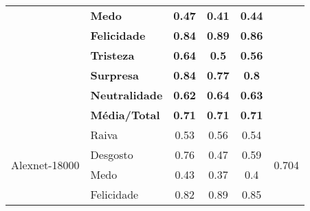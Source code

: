 \begin{table}[]
\begin{tabular}{llcccc}
                                        & \textbf{Medo}         & \textbf{0.47}                         & \textbf{0.41}                          & \textbf{0.44}                         &                                       \\
                                        & \textbf{Felicidade}   & \textbf{0.84}                         & \textbf{0.89}                          & \textbf{0.86}                         &                                       \\
                                        & \textbf{Tristeza}     & \textbf{0.64}                         & \textbf{0.5}                           & \textbf{0.56}                         &                                       \\
                                        & \textbf{Surpresa}     & \textbf{0.84}                         & \textbf{0.77}                          & \textbf{0.8}                          &                                       \\
                                        & \textbf{Neutralidade} & \textbf{0.62}                         & \textbf{0.64}                          & \textbf{0.63}                         &                                       \\
                                        & \textbf{Média/Total}  & \textbf{0.71}                         & \textbf{0.71}                          & \textbf{0.71}                         &                                       \\ \hline
\multirow{8}{*}{Alexnet-18000}          & Raiva                 & 0.53                                  & 0.56                                   & 0.54                                  & \multirow{8}{*}{0.704}                \\
                                        & Desgosto              & 0.76                                  & 0.47                                   & 0.59                                  &                                       \\
                                        & Medo                  & 0.43                                  & 0.37                                   & 0.4                                   &                                       \\
                                        & Felicidade            & 0.82                                  & 0.89                                   & 0.85                                  &                                       \\

\end{tabular}
\end{table}
